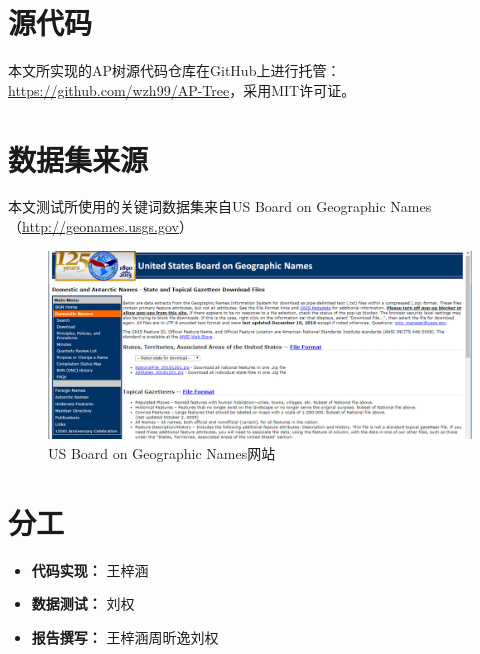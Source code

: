 \documentclass[UTF8]{ctexart}
\begin{document}
\begin{appendices}

\section{源代码}
本文所实现的AP树源代码仓库在GitHub上进行托管：\url{https://github.com/wzh99/AP-Tree}，采用MIT许可证。

\section{数据集来源}
本文测试所使用的关键词数据集来自US Board on Geographic Names（\url{http://geonames.usgs.gov}）

\begin{figure}[htbp]
    \centering
    \includegraphics[width=\textwidth]{gn.png}
    \caption{US Board on Geographic Names网站}
\end{figure}

\section{分工}
\begin{itemize}
    \item \textbf{代码实现：} 王梓涵
    \item \textbf{数据测试：} 刘权
    \item \textbf{报告撰写：} 王梓涵\quad 周昕逸\quad 刘权
\end{itemize}

\end{appendices}
\end{document}
